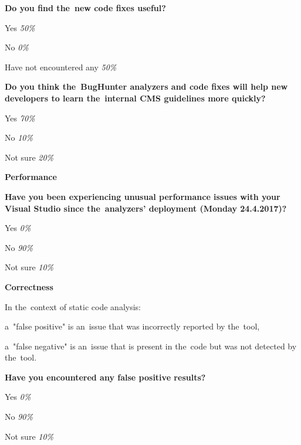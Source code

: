 \documentclass[
  digital, %
  table,   %
  lof,     %
  lot,     %
  oneside,
]{fithesis3}
\begin{document}
\smallskip\noindent
\textbf{Do you find the~new code fixes useful?}
\begin{compactitem}
\item Yes \textit{50\%}
\item No \textit{0\%}
\item Have not encountered any \textit{50\%}
\end{compactitem}

\smallskip\noindent
\textbf{Do you think the~BugHunter analyzers and code fixes will help new developers to learn the~internal CMS guidelines more quickly?}
\begin{compactitem}
\item Yes \textit{70\%}
\item No \textit{10\%}
\item Not sure \textit{20\%}
\end{compactitem}

\newpage
\begin{center}
\textbf{Performance}
\end{center}

\smallskip\noindent
\textbf{Have you been experiencing unusual performance issues with your Visual Studio since the~analyzers' deployment (Monday 24.4.2017)?}
\begin{compactitem}
\item Yes \textit{0\%}
\item No \textit{90\%}
\item Not sure \textit{10\%}
\end{compactitem}

\begin{center}
\textbf{Correctness}
\end{center}

\noindent
In the~context of static code analysis:
\begin{compactitem}
\item a~"false positive" is an~issue that was incorrectly reported by the~tool,
\item a~"false negative" is an~issue that is present in the~code but was not detected by the~tool.
\end{compactitem}

\bigskip
\noindent
\textbf{Have you encountered any false positive results?}
\begin{compactitem}
\item Yes \textit{0\%}
\item No \textit{90\%}
\item Not sure \textit{10\%}
\end{compactitem}
\end{document}
